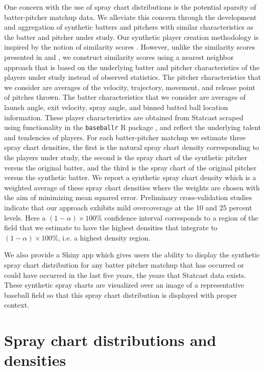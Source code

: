 \documentclass[12pt]{article}
\begin{document}
One concern with the use of spray chart distributions is the potential sparsity of batter-pitcher matchup data. We alleviate this concern through the development and aggregation of synthetic batters and pitchers with similar characteristics as the batter and pitcher under study. Our synthetic player creation methodology is inspired by the notion of similarity scores \citep{james1994politics, PECOTA}. However, unlike the similarity scores presented in \cite{james1994politics} and \cite{PECOTA}, we construct similarity scores using a nearest neighbor approach that is based on the underlying batter and pitcher characteristics of the players under study instead of observed statistics. The pitcher characteristics that we consider are averages of the velocity, trajectory, movement, and release point of pitches thrown. The batter characteristics that we consider are averages of launch angle, exit velocity, spray angle, and binned batted ball location information. These player characteristics are obtained from Statcast \citep{statcast} scraped using functionality in the \texttt{baseballr} R package \citep{baseballr}, and reflect the underlying talent and tendencies of players. For each batter-pitcher matchup we estimate three spray chart densities, the first is the natural spray chart density corresponding to the players under study, the second is the spray chart of the synthetic pitcher versus the original batter, and the third is the spray chart of the original pitcher versus the synthetic batter. We report a synthetic spray chart density which is a weighted average of these spray chart densities where the weights are chosen with the aim of minimizing mean squared error. Preliminary cross-validation studies indicate that our approach exhibits mild overcoverage at the 10 and 25 percent levels. Here a $(1 - \alpha) \times 100\%$ confidence interval corresponds to a region of the field that we estimate to have the highest densities that integrate to $(1 - \alpha) \times 100\%$, i.e. a highest density region.

We also provide a Shiny app which gives users the ability to display the synthetic spray chart distribution for any batter pitcher matchup that has occurred or could have occurred in the last five years, the years that Statcast data exists. These synthetic spray charts are visualized over an image of a representative baseball field so that this spray chart distribution is displayed with proper context. 



\section{Spray chart distributions and densities}
\end{document}
